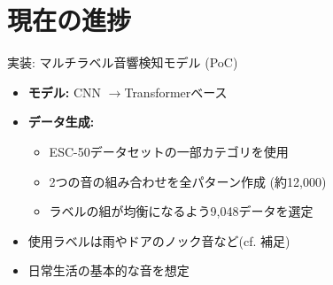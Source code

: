 \documentclass[unicode,12pt,aspectratio=169,dvipdfmx]{beamer}
\begin{document}
\section{現在の進捗}
\begin{frame}[fragile]{実装: マルチラベル音響検知モデル (PoC)}
  \begin{itemize}
    \item \textbf{モデル:} CNN $\rightarrow$Transformerベース
    \item \textbf{データ生成:}
    \begin{itemize}
        \item ESC-50データセットの一部カテゴリを使用
        \item 2つの音の組み合わせを全パターン作成 (約12,000)
        \item ラベルの組が均衡になるよう9,048データを選定
    \end{itemize}
    \item 使用ラベルは雨やドアのノック音など(cf. 補足)
    \item 日常生活の基本的な音を想定
  \end{itemize}
\end{frame}

\end{document}
